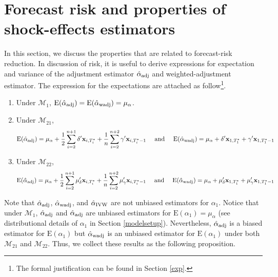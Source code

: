 \documentclass[11pt]{article}
\def\mbf#1{\mathbf{#1}} %
\def\mc#1{\mathcal{#1}} %
\def\E#1{\mathrm{E}(#1)} %
\theoremstyle{definition}
\begin{document}
\section{Forecast risk and properties of shock-effects estimators}
\label{properties}

In this section, we discuss the properties that are related to forecast-risk reduction. In discussion of risk, it is useful to derive expressions for expectation and variance of the adjustment estimator $\hat{\alpha}_{\rm adj}$ and weighted-adjustment estimator.  The expression for the expectations are attached as follow\footnote{The formal justification can be found in Section \ref{exp}.}.

 \begin{enumerate}[label = (\roman*)]
    \item Under $\mc{M}_{1}$, $\E{\hat{\alpha}_{\rm adj}}=\E{\hat{\alpha}_{\rm wadj}} = \mu_{\alpha}$.
    \item Under $\mc{M}_{21}$, 
    \begin{align*}
      \E{\hat{\alpha}_{\rm adj}} = \mu_{\alpha} + \frac{1}{2} \sum_{i=2}^{n+1} \delta' \mbf{x}_{i, T_i^*} + \frac{1}{n} \sum_{i=2}^{n+2} \gamma' \mbf{x}_{i, T_i^*-1} 
      \quad \text{ and } \quad 
       \E{\hat{\alpha}_{\rm wadj}} = \mu_{\alpha} + \delta'\mbf{x}_{1, T_1^*} + \gamma' \mbf{x}_{1, T_1^*-1}
    \end{align*}
    \item Under $\mc{M}_{22}$,
    \begin{align*}
      \E{\hat{\alpha}_{\rm adj}} = \mu_{\alpha} + \frac{1}{2} \sum_{i=2}^{n+1} \mu_{\delta}' \mbf{x}_{i, T_i^*} + \frac{1}{n} \sum_{i=2}^{n+2}  \mu_{\gamma}'\mbf{x}_{i, T_i^*-1} 
      \quad \text{ and } \quad 
       \E{\hat{\alpha}_{\rm wadj}} = \mu_{\alpha} + \mu_{\delta}'\mbf{x}_{1, T_1^*} + \mu_{\gamma}' \mbf{x}_{1, T_1^*-1}
    \end{align*}
  \end{enumerate}

Note that $\hat{\alpha}_{\rm adj}$, $\hat{\alpha}_{\rm wadj}$, and $\hat{\alpha}_{\rm IVW}$ are not unbiased estimators for $\alpha_1$. Notice that under $\mc{M}_{1}$, $\hat{\alpha}_{\rm adj}$ and $\hat{\alpha}_{\rm adj}$ are unbiased estimators for $\E{\alpha_1}=\mu_{\alpha}$ (see distributional details of $\alpha_1$ in Section \ref{modelsetup}). Nevertheless, $\hat{\alpha}_{\rm adj}$ is a biased estimator for $\E{\alpha_1}$ but $\hat{\alpha}_{\rm wadj}$ is an unbiased estimator for $\E{\alpha_1}$ under both $\mc{M}_{21}$ and $\mc{M}_{22}$. Thus, we collect these results  as the following proposition. 
\end{document}
